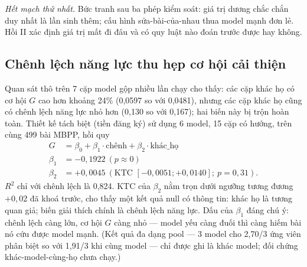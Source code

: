 \documentclass[11pt,a4paper]{article}
\begin{document}
\emph{Hết mạch thứ nhất.} Bức tranh sau ba phép kiểm soát: giá trị dương chắc chắn duy nhất là lần sinh thêm; cấu hình sửa-bài-của-nhau thua model mạnh đơn lẻ. Hồi II xác định giá trị mất đi đâu và có quy luật nào đoán trước được hay không.

\subsection{Chênh lệch năng lực thu hẹp cơ hội cải thiện}\label{sec:termG}

Quan sát thô trên 7 cặp model gộp nhiều lần chạy cho thấy: các cặp khác họ có cơ hội $G$ cao hơn khoảng 24\% (0,0597 so với 0,0481), nhưng các cặp khác họ cũng có chênh lệch năng lực nhỏ hơn (0,130 so với 0,167); hai biến này bị trộn hoàn toàn. Thiết kế tách biệt (tiền đăng ký) sử dụng 6 model, 15 cặp có hướng, trên cùng 499 bài MBPP, hồi quy
\begin{align*}
G &= \beta_0 + \beta_1\cdot\text{chênh} + \beta_2\cdot\text{khác\_họ}\\
\beta_1 &= -0{,}1922\ (p \approx 0)\\
\beta_2 &= +0{,}0045\ (\text{KTC } [-0{,}0051;+0{,}0140];\ p = 0{,}31).
\end{align*}
$R^2$ chỉ với chênh lệch là 0,824. KTC của $\beta_2$ nằm trọn dưới ngưỡng tương đương $+0{,}02$ đã khoá trước, cho thấy một kết quả null có thông tin: khác họ là tương quan giả; biến giải thích chính là chênh lệch năng lực. Dấu của $\beta_1$ đáng chú ý: chênh lệch càng lớn, cơ hội $G$ càng nhỏ --- model yếu càng đuối thì càng hiếm bài nó cứu được model mạnh. (Kết quả đa dạng pool --- 3 model cho 2,70/3 ứng viên phân biệt so với 1,91/3 khi cùng model --- chỉ được ghi là khác model; đối chứng khác-model-cùng-họ chưa chạy.)
\end{document}
